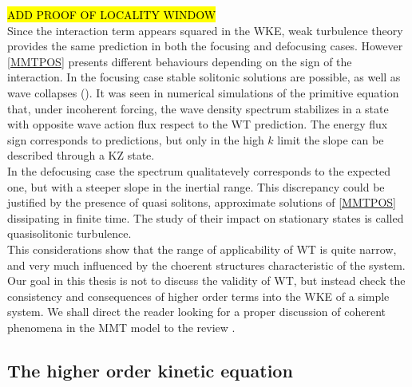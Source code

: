     \hl{ADD PROOF OF LOCALITY WINDOW}\\
    Since the interaction term appears squared in the WKE, weak turbulence theory provides the same prediction in both the focusing and defocusing cases. 
    However \eqref{MMTPOS} presents different behaviours depending on the sign of the interaction. 
    In the focusing case stable solitonic solutions are possible, as well as wave collapses
    (\cite{Zakharov2001}). It was seen in numerical simulations of the primitive equation that, under incoherent forcing, the wave density spectrum stabilizes in a state
    with opposite wave action flux respect to the WT prediction. The energy flux sign corresponds to predictions, but only in the high $k$ limit the slope can be 
    described through a KZ state.\\
    In the defocusing case the spectrum qualitatevely corresponds to the expected one, but with a steeper slope in the inertial range. This discrepancy could be justified 
    by the presence of quasi solitons, approximate solutions of \eqref{MMTPOS} dissipating in finite time. The study of their impact on stationary states is called 
    quasisolitonic turbulence. \\
    This considerations show that the range of applicability of WT is quite narrow, and very much influenced by the choerent structures characteristic of the system. 
    Our goal in this thesis is not to discuss the validity of WT, but instead check the consistency and consequences of higher order terms into the 
    WKE of a simple system. We shall direct the reader looking for a proper discussion of 
    coherent phenomena in the MMT model to the review \cite{ZAKHAROV2004}. \\
    \subsection{The higher order kinetic equation}

